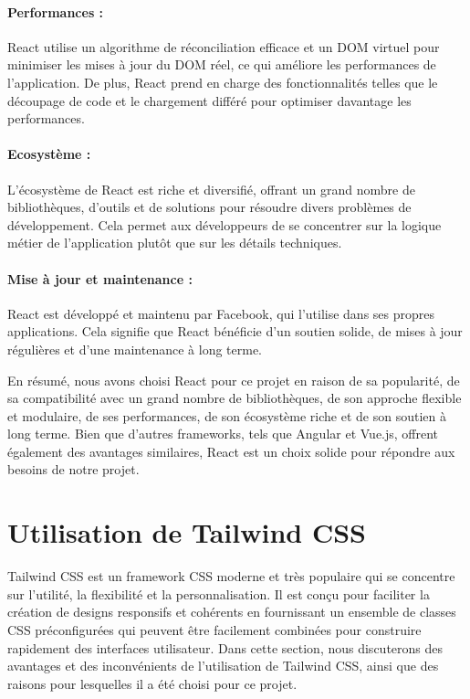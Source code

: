 \paragraph{Performances :} React utilise un algorithme de réconciliation efficace et un DOM virtuel pour minimiser les mises à jour du DOM réel, ce qui améliore les performances de l'application. De plus, React prend en charge des fonctionnalités telles que le découpage de code et le chargement différé pour optimiser davantage les performances.

\paragraph{Ecosystème :} L'écosystème de React est riche et diversifié, offrant un grand nombre de bibliothèques, d'outils et de solutions pour résoudre divers problèmes de développement. Cela permet aux développeurs de se concentrer sur la logique métier de l'application plutôt que sur les détails techniques.

\paragraph{Mise à jour et maintenance :} React est développé et maintenu par Facebook, qui l'utilise dans ses propres applications. Cela signifie que React bénéficie d'un soutien solide, de mises à jour régulières et d'une maintenance à long terme.

En résumé, nous avons choisi React pour ce projet en raison de sa popularité, de sa compatibilité avec un grand nombre de bibliothèques, de son approche flexible et modulaire, de ses performances, de son écosystème riche et de son soutien à long terme. Bien que d'autres frameworks, tels que Angular et Vue.js, offrent également des avantages similaires, React est un choix solide pour répondre aux besoins de notre projet.

\section{Utilisation de Tailwind CSS}

Tailwind CSS est un framework CSS moderne et très populaire qui se concentre sur l'utilité, la flexibilité et la personnalisation. Il est conçu pour faciliter la création de designs responsifs et cohérents en fournissant un ensemble de classes CSS préconfigurées qui peuvent être facilement combinées pour construire rapidement des interfaces utilisateur. Dans cette section, nous discuterons des avantages et des inconvénients de l'utilisation de Tailwind CSS, ainsi que des raisons pour lesquelles il a été choisi pour ce projet.

